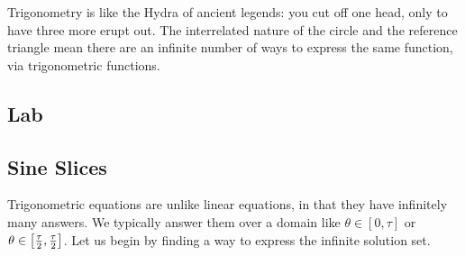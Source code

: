

Trigonometry is like the Hydra of ancient legends: you cut off one head, only to have
three more erupt out.  The interrelated nature of the circle and the reference triangle
mean there are an infinite number of ways to express the same function, via
trigonometric functions.


\newpage
\chapterminitoc


\newpage
{}
\subsection{Lab}
\noindent{}
\subsection{Sine Slices}
Trigonometric equations are unlike linear equations, in that they have infinitely many
answers.  We typically answer them over a domain like $\theta \in \left[0,\tau\right]$ or
$\theta \in \left[\-\frac{\tau}{2},\frac{\tau}{2}\right]$.  Let us begin by finding a way to
express the infinite solution set.

